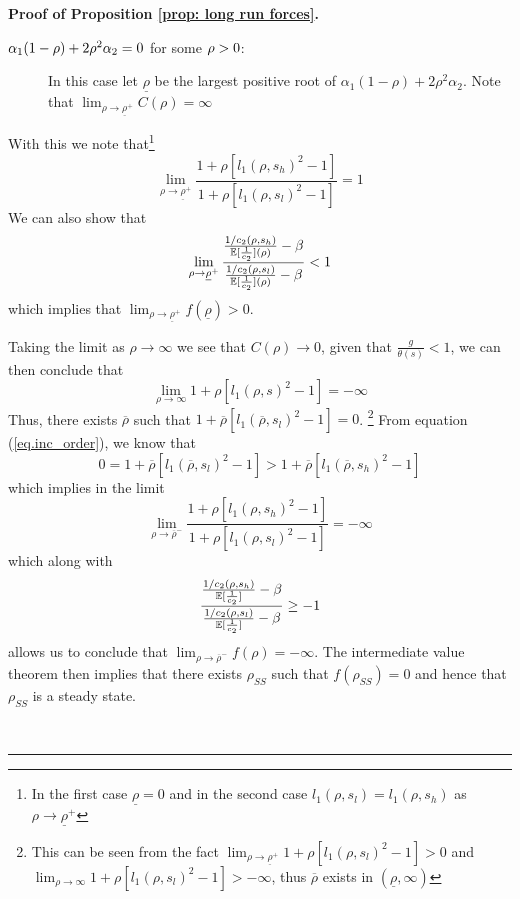 \documentclass[thmsb,11pt]{article}
\newenvironment{proof}[1][Proof]{\noindent \textbf{#1.} }{\  \rule{0.5em}{0.5em}}
\begin{document}
\begin{appendix}
\begin{proof}[Proof of Proposition \ref{prop: long run forces}]
\begin{description}
\begin{description}
\item[$\protect\alpha_1(1-\protect\rho)+2\protect\rho^2\protect\alpha_2 = 0$
for some $\protect\rho>0$:] In this case let $\underline \rho$ be the
largest positive root of $\alpha_1(1-\rho)+2\rho^2\alpha_2$. Note that $%
\lim_{\rho\rightarrow \underline \rho^+}C(\rho) = \infty$
\end{description}

With this we note that\footnote{In the first case $\underline {\rho}=0$ and in the second case $l_1(\rho,s_l)=l_1(\rho,s_h)$ as $\rho \to \underline{\rho}^{+}$}
\begin{equation*}
\lim_{\rho\rightarrow \underline \rho^+} \frac{1+\rho[l_1(\rho,s_h)^2-1]}{1+%
\rho[l_1(\rho,s_l)^2-1]} = 1
\end{equation*}%
We can also show that
\begin{equation*}
\lim_{\rho\rightarrow\underline \rho^+} \frac{\frac{1/c_2(\rho,s_h)}{\mathbb{%
E}[\frac1{c_2}](\rho)}-\beta }{\frac{1/c_2(\rho,s_l)}{\mathbb{E}%
[\frac1{c_2}](\rho)}-\beta} < 1
\end{equation*}
which implies that $\lim_{\rho\rightarrow \underline \rho^+} f(\underline
\rho) > 0$.

Taking the limit as $\rho\rightarrow\infty$ we see that $C(\rho)\rightarrow
0 $, given that $\frac g{\theta(s)} <1$, we can then conclude that
\begin{equation*}
\lim_{\rho\rightarrow\infty } 1+ \rho[l_1(\rho,s)^2-1] = -\infty
\end{equation*}
Thus, there exists $\overline \rho$ such that $1+\overline \rho[%
l_1(\overline \rho,s_l)^2-1] = 0$. \footnote{This can be seen from the fact $\lim_{\rho\rightarrow \underline
\rho^+} 1+\rho[l_1(\rho,s_l)^2 -1] > 0$ and $\lim_{\rho\rightarrow \infty } 1+\rho[l_1(\rho,s_l)^2 -1] > -\infty$, thus $\overline{\rho}$ exists in $(\underline{\rho},\infty)$ } From equation (\ref{eq.inc_order}), we
know that
\begin{equation*}
0 = 1+\overline \rho[l_1(\overline \rho,s_l)^2-1] > 1+\overline \rho[%
l_1(\overline \rho,s_h)^2-1]
\end{equation*}
which implies in the limit
\begin{equation*}
\lim_{\rho\rightarrow \overline \rho^-}\frac{1+\rho[l_1(\rho,s_h)^2-1]}{1+%
\rho[l_1(\rho,s_l)^2-1]} = -\infty
\end{equation*}
which along with
\begin{equation*}
\frac{\frac{1/c_2(\rho,s_h)}{\mathbb{E}[\frac1{c_2}]}-\beta }{\frac{%
1/c_2(\rho,s_l)}{\mathbb{E}[\frac1{c_2}]}-\beta} \geq -1
\end{equation*}
allows us to conclude that $\lim_{\rho\rightarrow \overline \rho^-} f(\rho)
= -\infty$. The intermediate value theorem then implies that there exists $%
\rho_{SS}$ such that $f(\rho_{SS}) = 0$ and hence that $\rho_{SS}$ is a
steady state.


\end{description}
\end{proof}
\end{appendix}
\end{document}
